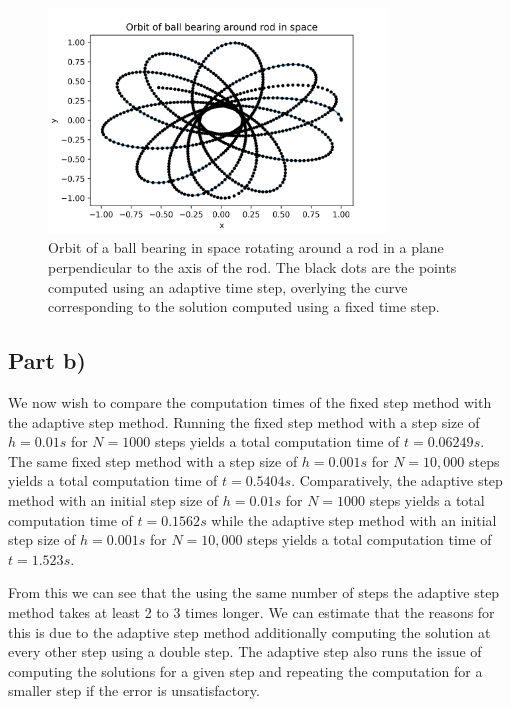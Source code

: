 \documentclass{article}
\begin{document}
\begin{figure}[H]
	\centering
	\includegraphics[width=0.8\textwidth]{../images/q1_orbit.png}
	\caption{Orbit of a ball bearing in space rotating around a rod in a plane perpendicular to the axis of the rod. The black dots are the points computed using an adaptive time step, overlying the curve corresponding to the solution computed using a fixed time step.}
	\label{fig:q1_a}
\end{figure}

\subsection{Part b)}
We now wish to compare the computation times of the fixed step method with the adaptive step method. Running the fixed step method with a step size of $h=0.01s$ for $N=1000$ steps yields a total computation time of $t=0.06249s$. The same fixed step method with a step size of $h=0.001s$ for $N=10,000$ steps yields a total computation time of $t=0.5404s$.
Comparatively, the adaptive step method with an initial step size of $h=0.01s$ for $N=1000$ steps yields a total computation time of $t=0.1562s$ while the adaptive step method with an initial step size of $h=0.001s$ for $N=10,000$ steps yields a total computation time of $t=1.523s$.

From this we can see that the using the same number of steps the adaptive step method takes at least 2 to 3 times longer. We can estimate that the reasons for this is due to the adaptive step method additionally computing the solution at every other step using a double step. The adaptive step also runs the issue of computing the solutions for a given step and repeating the computation for a smaller step if the error is unsatisfactory. 
\end{document}
